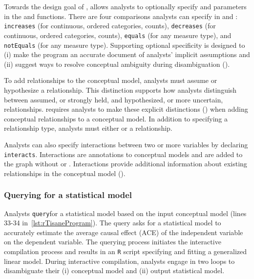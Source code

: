 Towards the design goal of \optionalSpecificity, \rTisane allows analysts to
optionally specify \when and \then parameters in the \causes and \relates
functions. There are four comparisons analysts can specify in
\when and \then: \texttt{increases} (for continuous, ordered categories,
counts), \texttt{decreases} (for continuous, ordered categories, counts),
\texttt{equals} (for any measure type), and \texttt{notEquals} (for any measure
type). Supporting optional specificity is designed to (i) make the \rTisane
program an accurate document of analysts' implicit assumptions and (ii) suggest
ways to resolve conceptual ambiguity during disambiguation
(\considerPossibilities). 

To add relationships to the conceptual model, analysts must assume or
hypothesize a relationship. This distinction supports how analysts distinguish
between assumed, or strongly held, and hypothesized, or more uncertain,
relationships. \rTisane requires analysts to make these explicit distinctions
(\assumeHypothesize) when adding conceptual relationships to a conceptual model.
In addition to specifying a relationship type, analysts must either \assume or
\hypothesize a relationship. 


Analysts can also specify interactions between two or more variables by
declaring \texttt{interacts}. Interactions are annotations to conceptual models
and are added to the graph without \assume or \hypothesize. Interactions provide
additional information about existing relationships in the conceptual model
(\interactionAsPartialSpec). 

\def\query{\texttt{query}\xspace}
\subsubsection{Querying for a statistical model}
Analysts \query \rTisane for a statistical model based on the input conceptual
model (lines 33-34 in~\autoref{lst:rTisaneProgram}). The query asks for a statistical model to accurately
estimate the average causal effect (ACE) of the independent variable on the
dependent variable. The querying process initiates the interactive compilation
process and results in an \texttt{R} script specifying and fitting a generalized
linear model. During interactive compilation, analysts engage in two loops to
disambiguate their (i) conceptual model and (ii) output statistical model. 

